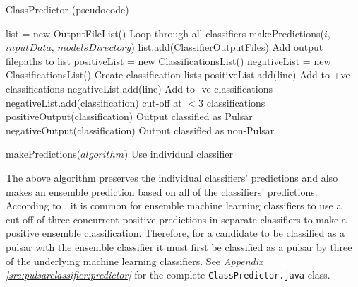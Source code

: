 \documentclass{article}
\begin{document}
\begin{appendices}
\begin{subappendices}
\begin{algorithm}[H]
    \caption{ClassPredictor (pseudocode)}
    \begin{algorithmic}[1]
            \State list = new OutputFileList()
                \Comment Loop through all classifiers
                \State makePredictions($i$, $inputData$, $modelsDirectory$)
                \State list.add(ClassifierOutputFiles)
                \Comment Add output filepaths to list
            \EndFor
            \State positiveList = new ClassificationsList()
            \State negativeList = new ClassificationsList()
            \Comment Create classification lists
                        \State positiveList.add(line)
                        \Comment Add to +ve classifications
                    \EndFor
                        \State negativeList.add(line)
                        \Comment Add to -ve classifications
                    \EndFor
                \EndIf
            \EndFor
                    \State negativeList.add(classification)
                    \Comment cut-off at $< 3$ classifications
                \Else
                    \State positiveOutput(classification)
                    \Comment Output classified as Pulsar
                \EndIf
            \EndFor
                \State negativeOutput(classification)
                \Comment Output classified as non-Pulsar
            \EndFor

        \Else 
            \State makePredictions($algorithm$)
            \Comment Use individual classifier
        \EndIf
        
    \end{algorithmic}
\end{algorithm}

The above algorithm preserves the individual classifiers' predictions and also makes an ensemble prediction based on all of the classifiers' predictions. According to \cite{tan}, it is common for ensemble machine learning classifiers to use a cut-off of three concurrent positive predictions in separate classifiers to make a positive ensemble classification. Therefore, for a candidate to be classified as a pulsar with the ensemble classifier it must first be classified as a pulsar by three of the underlying machine learning classifiers. See \emph{Appendix \ref{src:pulsarclassifier:predictor}} for the complete \verb|ClassPredictor.java| class.


\end{subappendices}
\end{appendices}
\end{document}

